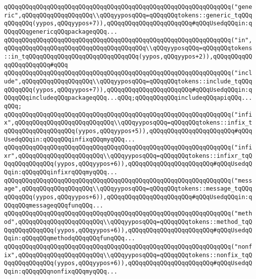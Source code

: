 \verb|qQQqqQQqqQQqqQQqqQQqqQQqqQQqqQQqqQQqqQQqqQQqqQQqqQQqqQQqqQQqqQQq("generic",qQQqqQQqqQQqqQQqqQQq\\qQQqyyposqQQq=qQQqqQQqtokens::generic_tqQQqqQQqqQQq(yypos,qQQqyypos+7)),qQQqqQQqqQQqqQQqqQQqqQQq#qQQqUsedqQQqin:qQQqqQQqgenericqQQqpackageqQQq...|\newline
\verb|qQQqqQQqqQQqqQQqqQQqqQQqqQQqqQQqqQQqqQQqqQQqqQQqqQQqqQQqqQQqqQQq("in",qQQqqQQqqQQqqQQqqQQqqQQqqQQqqQQqqQQqqQQq\\qQQqyyposqQQq=qQQqqQQqtokens::in_tqQQqqQQqqQQqqQQqqQQqqQQqqQQqqQQq(yypos,qQQqyypos+2)),qQQqqQQqqQQqqQQqqQQqqQQq#qQQq|\newline
\verb|qQQqqQQqqQQqqQQqqQQqqQQqqQQqqQQqqQQqqQQqqQQqqQQqqQQqqQQqqQQqqQQq("include",qQQqqQQqqQQqqQQqqQQq\\qQQqyyposqQQq=qQQqqQQqtokens::include_tqQQqqQQqqQQq(yypos,qQQqyypos+7)),qQQqqQQqqQQqqQQqqQQqqQQq#qQQqUsedqQQqin:qQQqqQQqincludeqQQqpackageqQQq...qQQq;qQQqqQQqqQQqincludeqQQqapiqQQq...qQQq;|\newline
\verb|qQQqqQQqqQQqqQQqqQQqqQQqqQQqqQQqqQQqqQQqqQQqqQQqqQQqqQQqqQQqqQQq("infix",qQQqqQQqqQQqqQQqqQQqqQQqqQQq\\qQQqyyposqQQq=qQQqqQQqtokens::infix_tqQQqqQQqqQQqqQQqqQQq(yypos,qQQqyypos+5)),qQQqqQQqqQQqqQQqqQQqqQQq#qQQqUsedqQQqin:qQQqqQQqinfixqQQqmyqQQq...|\newline
\verb|qQQqqQQqqQQqqQQqqQQqqQQqqQQqqQQqqQQqqQQqqQQqqQQqqQQqqQQqqQQqqQQq("infixr",qQQqqQQqqQQqqQQqqQQqqQQq\\qQQqyyposqQQq=qQQqqQQqtokens::infixr_tqQQqqQQqqQQqqQQq(yypos,qQQqyypos+6)),qQQqqQQqqQQqqQQqqQQqqQQq#qQQqUsedqQQqin:qQQqqQQqinfixrqQQqmyqQQq...|\newline
\verb|qQQqqQQqqQQqqQQqqQQqqQQqqQQqqQQqqQQqqQQqqQQqqQQqqQQqqQQqqQQqqQQq("message",qQQqqQQqqQQqqQQqqQQq\\qQQqyyposqQQq=qQQqqQQqtokens::message_tqQQqqQQqqQQq(yypos,qQQqyypos+6)),qQQqqQQqqQQqqQQqqQQqqQQq#qQQqUsedqQQqin:qQQqqQQqmessageqQQqfunqQQq...|\newline
\verb|qQQqqQQqqQQqqQQqqQQqqQQqqQQqqQQqqQQqqQQqqQQqqQQqqQQqqQQqqQQqqQQq("method",qQQqqQQqqQQqqQQqqQQqqQQq\\qQQqyyposqQQq=qQQqqQQqtokens::method_tqQQqqQQqqQQqqQQq(yypos,qQQqyypos+6)),qQQqqQQqqQQqqQQqqQQqqQQq#qQQqUsedqQQqin:qQQqqQQqmethodqQQqqQQqfunqQQq...|\newline
\verb|qQQqqQQqqQQqqQQqqQQqqQQqqQQqqQQqqQQqqQQqqQQqqQQqqQQqqQQqqQQqqQQq("nonfix",qQQqqQQqqQQqqQQqqQQqqQQq\\qQQqyyposqQQq=qQQqqQQqtokens::nonfix_tqQQqqQQqqQQqqQQq(yypos,qQQqyypos+6)),qQQqqQQqqQQqqQQqqQQqqQQq#qQQqUsedqQQqin:qQQqqQQqnonfixqQQqmyqQQq...|\newline
